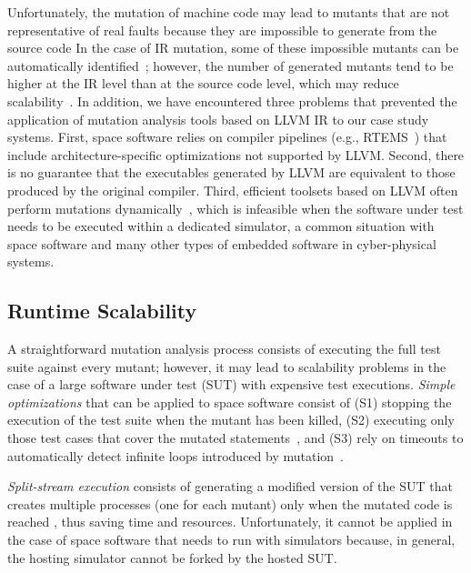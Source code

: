 Unfortunately, the mutation of machine code
may lead to mutants that are not representative of real faults  because they are impossible to generate from the source code
In the case of IR mutation, some of these impossible mutants can be automatically identified~\cite{denisov2018mull}; however,
the number of generated mutants tend to be higher at the IR level than at the source code level, which may reduce scalability~\cite{hariri2019comparing}.
 In addition, we have encountered three problems that prevented the application of
 mutation analysis tools based on LLVM IR to our case study systems.
First, space software relies on compiler pipelines (e.g., RTEMS~\cite{RTEMS}) that include architecture-specific optimizations not supported by LLVM.
Second, there is no guarantee that the executables generated by LLVM are equivalent to those produced by the original compiler.
 Third, efficient toolsets based on LLVM often perform mutations dynamically~\cite{denisov2018mull}, which is infeasible when the software under test needs to be executed within a dedicated simulator, a common situation with space software and many other types of embedded software in cyber-physical systems.




\subsection{Runtime Scalability}
\label{sec:scalability}

A straightforward mutation analysis process consists of executing the full test suite against every mutant; however, it may lead to scalability problems in the case of a large software under test (SUT) with expensive test executions.
\emph{Simple optimizations} that can be applied to space software consist of (S1) stopping the execution of the test suite when the mutant has been killed, (S2) executing only those test cases that cover the mutated statements~\cite{delamaro1996proteum}, and (S3) rely on timeouts to automatically detect infinite loops introduced by mutation~\cite{papadakis2019mutation}.

\emph{Split-stream execution} consists of generating a modified version of the SUT that creates multiple processes (one for each mutant) only when the mutated code is reached \cite{king1991fortran,tokumoto2016muvm}, thus saving time and resources. Unfortunately, it cannot be applied in the case of space software that needs to run with simulators because, in general, the hosting simulator cannot be forked by the hosted SUT.

